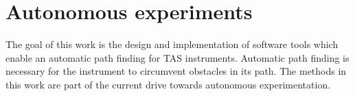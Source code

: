 \section{Autonomous experiments \label{sec:autonomous}}

The goal of this work is the design and implementation of software tools which enable an automatic path finding for TAS instruments.
Automatic path finding is necessary for the instrument to circumvent obstacles in its path. The methods in this work are part of the current drive towards autonomous experimentation.
